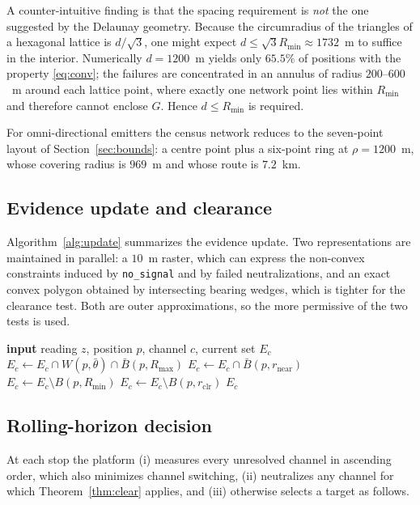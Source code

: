 \documentclass[preprint,12pt,3p]{elsarticle}
\theoremstyle{definition}
\newcommand{\Rmin}{R_{\min}}
\newcommand{\Rmax}{R_{\max}}
\begin{document}
A counter-intuitive finding is that the spacing requirement is \emph{not} the one suggested by the
Delaunay geometry. Because the circumradius of the triangles of a hexagonal lattice is
$d/\sqrt3$, one might expect $d\le\sqrt3\Rmin\approx1732$~m to suffice in the interior. Numerically
$d=1200$~m yields only $65.5\%$ of positions with the property \eqref{eq:conv}; the failures are
concentrated in an annulus of radius $200$--$600$~m around each lattice point, where exactly one
network point lies within $\Rmin$ and therefore cannot enclose $G$. Hence $d\le\Rmin$ is required.

For omni-directional emitters the census network reduces to the seven-point layout of
Section~\ref{sec:bounds}: a centre point plus a six-point ring at $\rho=1200$~m, whose covering
radius is $969$~m and whose route is $7.2$~km.

\subsection{Evidence update and clearance}
Algorithm~\ref{alg:update} summarizes the evidence update. Two representations are maintained in
parallel: a $10$~m raster, which can express the non-convex constraints induced by
\texttt{no\_signal} and by failed neutralizations, and an exact convex polygon obtained by
intersecting bearing wedges, which is tighter for the clearance test. Both are outer
approximations, so the more permissive of the two tests is used.

\begin{algorithm}[t]
\caption{Evidence update for channel $c$}
\label{alg:update}
\begin{algorithmic}[1]
\State \textbf{input} reading $z$, position $p$, channel $c$, current set $E_c$
    \State $E_c \gets E_c\cap W(p,\bar\theta)\cap \bar B(p,\Rmax)$
    \State $E_c \gets E_c\cap \bar B(p,r_{\mathrm{near}})$
    \State $E_c \gets E_c\setminus B(p,\Rmin)$
    \State $E_c \gets E_c\setminus B(p,r_{\mathrm{clr}})$
\EndIf
\State \Return $E_c$
\end{algorithmic}
\end{algorithm}

\subsection{Rolling-horizon decision}
At each stop the platform (i) measures every unresolved channel in ascending order, which also
minimizes channel switching, (ii) neutralizes any channel for which
Theorem~\ref{thm:clear} applies, and (iii) otherwise selects a target as follows.
\end{document}
